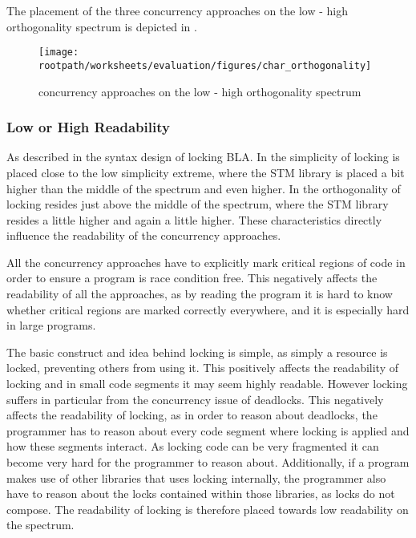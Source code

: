 The placement of the three concurrency approaches on the low - high orthogonality spectrum is depicted in .


\begin{figure}[htbp]
\centering
 \texttt{[image: \\rootpath/worksheets/evaluation/figures/char\_orthogonality]} 
 \caption{concurrency approaches on the low - high orthogonality spectrum}
\label{fig:char_orthogonality}
\end{figure}

\subsubsection{Low or High Readability}\label{subsec:char_readability}
As described in  the syntax design of locking BLA. In  the simplicity of locking is placed close to the low simplicity extreme, where the \ac{STM} library is placed a bit higher than the middle of the spectrum and \stmname even higher. In  the orthogonality of locking resides just above the middle of the spectrum, where the \ac{STM} library resides a little higher and \stmname again a little higher. These characteristics directly influence the readability of the concurrency approaches.

All the concurrency approaches have to explicitly mark critical regions of code in order to ensure a program is race condition free. This negatively affects the readability of all the approaches, as by reading the program it is hard to know whether critical regions are marked correctly everywhere, and it is especially hard in large programs.

The basic  construct and idea behind locking is simple, as simply a resource is locked, preventing others from using it. This positively affects the readability of locking and in small code segments it may seem highly readable. However locking suffers in particular from the concurrency issue of deadlocks. This negatively affects the readability of locking, as in order to reason about deadlocks, the programmer has to reason about every code segment where locking is applied and how these segments interact. As locking code can be very fragmented it can become very hard for the programmer to reason about. Additionally, if a program makes use of other libraries that uses locking internally, the programmer also have to reason about the locks contained within those libraries, as locks do not compose. The readability of locking is therefore placed towards low readability on the spectrum.

